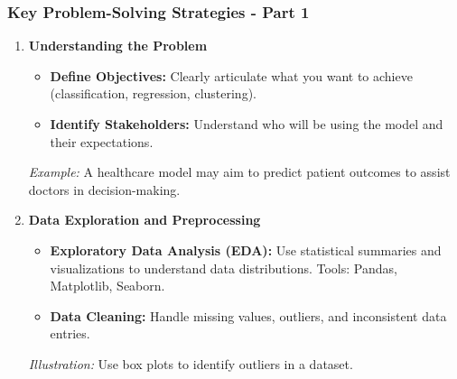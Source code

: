 \documentclass[aspectratio=169]{beamer}
\begin{document}
\begin{frame}[fragile]
    \frametitle{Key Problem-Solving Strategies - Part 1}
    \begin{enumerate}
        \item \textbf{Understanding the Problem}
            \begin{itemize}
                \item \textbf{Define Objectives:} Clearly articulate what you want to achieve (classification, regression, clustering).
                \item \textbf{Identify Stakeholders:} Understand who will be using the model and their expectations.
            \end{itemize}
            \pause
            \textit{Example:} A healthcare model may aim to predict patient outcomes to assist doctors in decision-making.
            
        \item \textbf{Data Exploration and Preprocessing}
            \begin{itemize}
                \item \textbf{Exploratory Data Analysis (EDA):} Use statistical summaries and visualizations to understand data distributions. Tools: Pandas, Matplotlib, Seaborn.
                \item \textbf{Data Cleaning:} Handle missing values, outliers, and inconsistent data entries.
            \end{itemize}
            \pause
            \textit{Illustration:} Use box plots to identify outliers in a dataset.
    \end{enumerate}
\end{frame}
\end{document}
